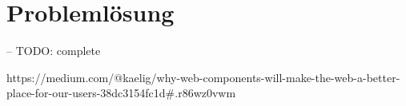 \section{Problemlösung}\label{problemluxf6sung}

-- TODO: complete

https://medium.com/@kaelig/why-web-components-will-make-the-web-a-better-place-for-our-users-38dc3154fc1d\#.r86wz0vwm
